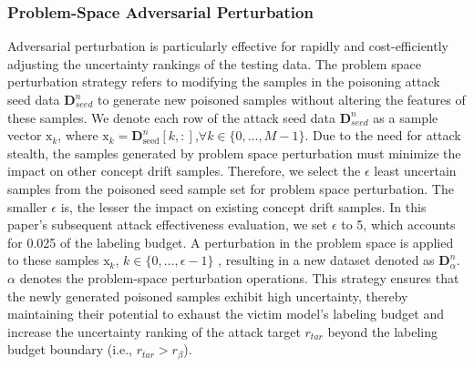 \subsubsection{Problem-Space Adversarial Perturbation}
\label{Sec: Strategy I-Problem-Space Perturbation}
Adversarial perturbation is particularly effective for rapidly and cost-efficiently adjusting the uncertainty rankings of the testing data.
The problem space perturbation strategy refers to modifying the samples in the poisoning attack seed data $\bm{D}_{seed}^{n}$ to generate new poisoned samples without altering the features of these samples.
We denote each row of the attack seed data $\bm{D}_{seed}^{n}$ as a sample vector $\bm{\mathrm{x}}_{k}$, where $\bm{\mathrm{x}}_{k} = \bm{D}_{\text{seed}}^{n}[k,:]$,$\forall k \in \{0, \dots, M-1 \}$.
Due to the need for attack stealth, the samples generated by problem space perturbation must minimize the impact on other concept drift samples. 
Therefore, we select the $\epsilon$ least uncertain samples from the poisoned seed sample set for problem space perturbation. 
The smaller $\epsilon$ is, the lesser the impact on existing concept drift samples.
In this paper's subsequent attack effectiveness evaluation, we set $\epsilon$ to 5, which accounts for 0.025 of the labeling budget.
A perturbation in the problem space is applied to these samples $\bm{\mathrm{x}}_{k}$, $k \in \{0, \dots,  \epsilon-1 \}$ , resulting in a new dataset denoted as $\bm{D}_{\alpha}^{n}$.
$\alpha$ denotes the problem-space perturbation operations.
This strategy ensures that the newly generated poisoned samples exhibit high uncertainty, thereby maintaining their potential to exhaust the victim model’s labeling budget and increase the uncertainty ranking of the attack target $r_{tar}$ beyond the labeling budget boundary (i.e., $r_{tar} > r_{\beta}$).
\begin{table}[h!]
	\caption{Problem-Space Perturbation Operations}
	\label{tab: List of Problem Space Perturbation Operations}
	\setlength{\tabcolsep}{5.8pt}
	\begin{center}
	\end{center}
\end{table}

